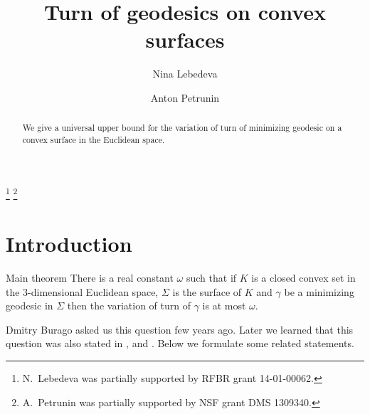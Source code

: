 \documentclass[a4paper,10pt]{amsart}
\begin{document}
\title{Turn of geodesics on convex surfaces}
\author{Nina Lebedeva}
\address{N. Lebedeva\newline\vskip-4mm
Math. Dept.
St. Petersburg State University,
Universitetsky pr., 28, 
Stary Peterhof, 
198504, Russia.
\newline\vskip-4mm
Steklov Institute,
27 Fontanka, St. Petersburg, 
191023, Russia.}
\author{Anton Petrunin}
\address{A. Petrunin\newline\vskip-4mm
Math. Dept. PSU,
University Park, PA 16802,
USA}
\thanks{N.~Lebedeva was partially supported by RFBR grant 
14-01-00062.}
\thanks{A.~Petrunin was partially supported by NSF grant DMS 1309340.}


\date{}

\begin{abstract}
We give a universal upper bound for the variation of turn of minimizing geodesic on a convex surface in the Euclidean space.
\end{abstract}
\maketitle


\section{Introduction}

\begin{thm}{Main theorem}\label{thm:main}
There is a real constant $\omega$ such that 
if $K$ is a closed convex set in the 3-dimensional Euclidean space,
$\Sigma$ is the surface of $K$ 
and $\gamma$ be a minimizing geodesic in $\Sigma$
then the variation of turn of $\gamma$ is at most $\omega$.
\end{thm}

Dmitry Burago asked us this question few years ago.
Later we learned that this question was also stated in \cite{AH-PSV}, \cite{pach} and \cite{BKZ}.
Below we formulate some related statements.
\end{document}
